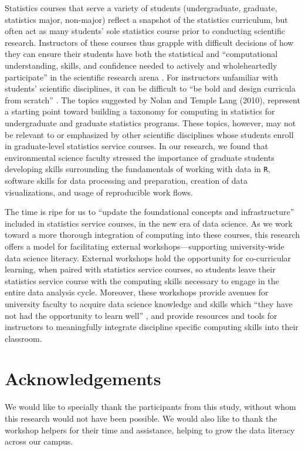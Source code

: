 \documentclass[12pt]{article}
\begin{document}
\quad Statistics courses that serve a variety of students (undergraduate,
graduate, statistics major, non-major) reflect a snapshot of the statistics
curriculum, but often act as many students' sole statistics course prior to
conducting scientific research. Instructors of these courses thus grapple with 
difficult decisions of how they can ensure their students have both the
statistical and ``computational understanding, skills, and confidence needed to
actively and wholeheartedly participate'' in the scientific research arena 
\citep[p. 106]{nolan}. For instructors unfamiliar with students' scientific
disciplines, it can be difficult to ``be bold and design curricula from
scratch'' \citep[p. 106]{nolan}. The topics suggested by Nolan and Temple Lang
(2010), represent a starting point toward building a taxonomy for computing in
statistics for undergraduate and graduate statistics programs. These topics,
however, may not be relevant to or emphasized by other scientific disciplines
whose students enroll in graduate-level statistics service courses.  In our
research, we found that environmental science faculty stressed the importance of
graduate students developing skills surrounding the fundamentals of working with
data in \texttt{R}, software skills for data processing and preparation, 
creation of data visualizations, and usage of reproducible work flows. 

\quad The time is ripe for us to ``update the foundational concepts and
infrastructure'' \citep[p.\ 5]{crossroads} included in statistics service
courses, in the new era of data science. As we work toward a more thorough
integration of computing into these courses, this research offers a model for
facilitating external workshops---supporting university-wide data science
literacy. External workshops hold the opportunity for co-curricular learning,
when paired with statistics service courses, so students leave their statistics
service course with the computing skills necessary to engage in the entire data
analysis cycle. Moreover, these workshops provide avenues for university faculty
to acquire data science knowledge and skills which ``they have not had the 
opportunity to learn well'' \citep[p. 106]{nolan}, and provide resources and
tools for instructors to meaningfully integrate discipline specific computing 
skills into their classroom. 

\section{Acknowledgements}

We would like to specially thank the participants from this study, without whom
this research would not have been possible. We would also like to thank the
workshop helpers for their time and assistance, helping to grow the data
literacy across our campus. 




\end{document}
